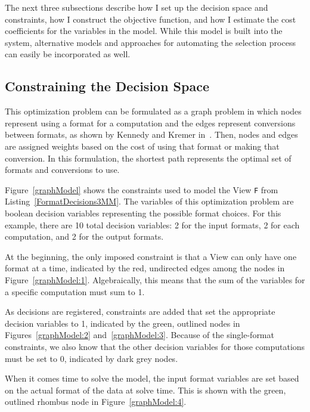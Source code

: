 The next three subsections describe how I set up the decision space and constraints, how I construct the objective function, and how I estimate the cost coefficients for the variables in the model.
While this model is built into the \FormatDecisions{} system, alternative models and approaches for automating the selection process can easily be incorporated as well.

\subsection{Constraining the Decision Space}

This optimization problem can be formulated as a graph problem in which nodes represent using a format for a computation and the edges represent conversions between formats, as shown by Kennedy and Kremer in~\cite{kennedy1998automatic}.
Then, nodes and edges are assigned weights based on the cost of using that format or making that conversion. 
In this formulation, the shortest path represents the optimal set of formats and conversions to use.

Figure~\ref{graphModel} shows the constraints used to model the View \verb.F. from Listing~\ref{FormatDecisions3MM}.
The variables of this optimization problem are boolean decision variables representing the possible format choices. 
For this example, there are 10 total decision variables: 2 for the input formats, 2 for each computation, and 2 for the output formats.

At the beginning, the only imposed constraint is that a View can only have one format at a time, indicated by the red, undirected edges among the nodes in Figure~\ref{graphModel:1}.
Algebraically, this means that the sum of the variables for a specific computation must sum to 1. 

As decisions are registered, constraints are added that set the appropriate decision variables to 1, indicated by the green, outlined nodes in Figures~\ref{graphModel:2} and~\ref{graphModel:3}. 
Because of the single-format constraints, we also know that the other decision variables for those computations must be set to 0, indicated by dark grey nodes.

When it comes time to solve the model, the input format variables are set based on the actual format of the data at solve time. This is shown with the green, outlined rhombus node in Figure~\ref{graphModel:4}.




